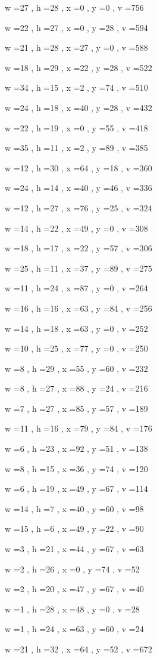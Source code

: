 \documentclass[11pt]{article}
\begin{document}
w =27 , h =28 , x =0 , y =0 , v =756
\par
w =22 , h =27 , x =0 , y =28 , v =594
\par
w =21 , h =28 , x =27 , y =0 , v =588
\par
w =18 , h =29 , x =22 , y =28 , v =522
\par
w =34 , h =15 , x =2 , y =74 , v =510
\par
w =24 , h =18 , x =40 , y =28 , v =432
\par
w =22 , h =19 , x =0 , y =55 , v =418
\par
w =35 , h =11 , x =2 , y =89 , v =385
\par
w =12 , h =30 , x =64 , y =18 , v =360
\par
w =24 , h =14 , x =40 , y =46 , v =336
\par
w =12 , h =27 , x =76 , y =25 , v =324
\par
w =14 , h =22 , x =49 , y =0 , v =308
\par
w =18 , h =17 , x =22 , y =57 , v =306
\par
w =25 , h =11 , x =37 , y =89 , v =275
\par
w =11 , h =24 , x =87 , y =0 , v =264
\par
w =16 , h =16 , x =63 , y =84 , v =256
\par
w =14 , h =18 , x =63 , y =0 , v =252
\par
w =10 , h =25 , x =77 , y =0 , v =250
\par
w =8 , h =29 , x =55 , y =60 , v =232
\par
w =8 , h =27 , x =88 , y =24 , v =216
\par
w =7 , h =27 , x =85 , y =57 , v =189
\par
w =11 , h =16 , x =79 , y =84 , v =176
\par
w =6 , h =23 , x =92 , y =51 , v =138
\par
w =8 , h =15 , x =36 , y =74 , v =120
\par
w =6 , h =19 , x =49 , y =67 , v =114
\par
w =14 , h =7 , x =40 , y =60 , v =98
\par
w =15 , h =6 , x =49 , y =22 , v =90
\par
w =3 , h =21 , x =44 , y =67 , v =63
\par
w =2 , h =26 , x =0 , y =74 , v =52
\par
w =2 , h =20 , x =47 , y =67 , v =40
\par
w =1 , h =28 , x =48 , y =0 , v =28
\par
w =1 , h =24 , x =63 , y =60 , v =24
\par
w =21 , h =32 , x =64 , y =52 , v =672
\par
\newpage
\end{document}
